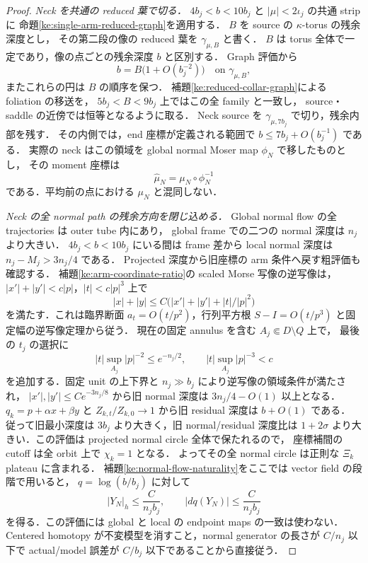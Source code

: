\begin{proof}
\emph{Neck を共通の reduced 葉で切る．}
$4b_j<b<10b_j$ と $|\mu|<2\iota_j$ の共通 strip に
命題\ref{ke:single-arm-reduced-graph}を適用する．
$B$ を source の $\kappa$-torus の残余深度とし，
その第二段の像の reduced 葉を $\gamma_{\mu,B}$ と書く．
$B$ は torus 全体で一定であり，像の点ごとの残余深度 $b$ と区別する．
Graph 評価から
\[
 b=B\bigl(1+O(b_j^{-2})\bigr)
 \quad\text{on }\gamma_{\mu,B},
\]
またこれらの円は $B$ の順序を保つ．
補題\ref{ke:reduced-collar-graph}による foliation の移送を，
$5b_j<B<9b_j$ 上ではこの全 family と一致し，
source・saddle の近傍では恒等となるように取る．
Neck source を $\gamma_{\mu,7b_j}$ で切り，残余内部を残す．
その内側では，end 座標が定義される範囲で
$b\le7b_j+O(b_j^{-1})$ である．
実際の neck はこの領域を global normal Moser map $\phi_N$ で移したものとし，
その moment 座標は
\[
 \widehat\mu_N=\mu_N\circ\phi_N^{-1}
\]
である．平均前の点における $\mu_N$ と混同しない．

\emph{Neck の全 normal path の残余方向を閉じ込める．}
Global normal flow の全 trajectories は outer tube 内にあり，
global frame での二つの normal 深度は $n_j$ より大きい．
$4b_j<b<10b_j$ にいる間は frame 差から local normal 深度は
$n_j-M_j>3n_j/4$ である．
Projected 深度から旧座標の arm 条件へ戻す粗評価も確認する．
補題\ref{ke:arm-coordinate-ratio}の scaled Morse 写像の逆写像は，
$|x'|+|y'|<c|p|$，$|t|<c|p|^3$ 上で
\[
 |x|+|y|\le C\bigl(|x'|+|y'|+|t|/|p|^2\bigr)
\]
を満たす．これは臨界断面 $a_t=O(t/p^2)$，行列平方根
$S-I=O(t/p^3)$ と固定幅の逆写像定理から従う．
現在の固定 annulus を含む $A_j\Subset D\setminus Q$ 上で，
最後の $t_j$ の選択に
\[
 |t|\sup_{A_j}|p|^{-2}\le e^{-n_j/2},\qquad
 |t|\sup_{A_j}|p|^{-3}<c
\]
を追加する．固定 unit の上下界と $n_j\gg b_j$ により逆写像の領域条件が満たされ，
$|x'|,|y'|\le C e^{-3n_j/8}$ から旧 normal 深度は
$3n_j/4-O(1)$ 以上となる．$q_k=p+\alpha x+\beta y$ と
$Z_{k,t}/Z_{k,0}\to1$ から旧 residual 深度は $b+O(1)$ である．
従って旧最小深度は $3b_j$ より大きく，旧 normal/residual 深度比は
$1+2\sigma$ より大きい．この評価は projected normal circle 全体で保たれるので，
座標補間の cutoff は全 orbit 上で $\chi_k=1$ となる．
よってその全 normal circle は正則な $\Xi_k$ plateau に含まれる．
補題\ref{ke:normal-flow-naturality}をここでは vector field の段階で用いると，
$q=\log(b/b_j)$ に対して
\begin{equation}\label{ke:eq:neck-residual-first-exit}
 |Y_N|_h\le\frac{C}{n_jb_j},\qquad
 |dq(Y_N)|\le\frac{C}{n_jb_j}
\end{equation}
を得る．この評価には global と local の endpoint maps の一致は使わない．
Centered homotopy が不変模型を消すこと，normal generator の長さが $C/n_j$ 以下で
actual/model 誤差が $C/b_j$ 以下であることから直接従う．


\end{proof}
